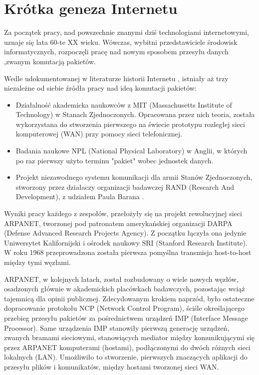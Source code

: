 \section{Krótka geneza Internetu}

Za początek pracy, nad powszechnie znanymi dziś technologiami internetowymi, uznaje się lata 60-te XX wieku. Wówczas, wybitni przedstawiciele środowisk informatycznych, rozpoczęli pracę nad nowym sposobem przesyłu danych ,zwanym komutacją pakietów.

Wedle udokumentowanej w literaturze historii Internetu \cite{Leiner.history-of-internet}, istniały aż trzy niezależne od siebie źródła pracy nad ideą komutacji pakietów: 

\begin{itemize}
    \item Działalność akademicka naukowców z MIT (Massachusetts Institute of Technology) w Stanach Zjednoczonych. Opracowana przez nich teoria, została wykorzystana do stworzenia pierwszego na świecie prototypu rozległej sieci komputerowej (WAN) przy pomocy sieci telefonicznej.
    \item Badania naukowe NPL (National Physical Laboratory) w Anglii, w których po raz pierwszy użyto terminu "pakiet" wobec jednostek danych.
    \item Projekt niezawodnego systemu komunikacji dla armii Stanów Zjednoczonych, stworzony przez działaczy organizacji badawczej RAND (Research And Development), z udziałem Paula Barana \cite{Baran.komutacja-pakietow}.
\end{itemize}

Wyniki pracy każdego z zespołów, przełożyły się na projekt rewolucyjnej sieci ARPANET, tworzonej pod patronatem amerykańskiej organizacji DARPA (Defense Advanced Research Projects Agency). Z początku łączyła ona jedynie Uniwersytet Kalifornijski i ośrodek naukowy SRI (Stanford Research Institute). W roku 1968 przeprowadzona została pierwsza pomyślna transmisja host-to-host między tymi węzłami. 

ARPANET, w kolejnych latach, został rozbudowany o wiele nowych węzłów, osadzonych głównie w akademickich placówkach badawczych, pozostając wciąż tajemnicą dla opinii publicznej. Zdecydowanym krokiem naprzód, było ostateczne dopracowanie protokołu NCP (Network Control Program), ściśle określającego przebieg przesyłu pakietów za pośrednictwem urządzeń IMP (Interface Message Processor). Same urządzenia IMP stanowiły pierwszą generację urządzeń, zwanych bramami sieciowymi, stanowiących mediator między komunikującymi się przez ARPANET komputerami (hostami), podłączonymi do dwóch różnych sieci lokalnych (LAN). Umożliwiło to stworzenie, pierwszych znaczących aplikacji do przesyłu plików i komunikatów, między hostami tworzonej sieci WAN.

